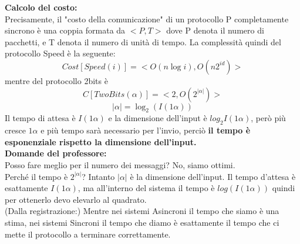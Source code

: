 \textbf{Calcolo del costo:}\\
Precisamente, il "costo della comunicazione" di un protocollo P completamente
sincrono è una coppia formata da $<P,T>$ dove P denota il numero di pacchetti, e
T denota il numero di unità di tempo. La complessità quindi del protocollo Speed
è la seguente:$$Cost[Speed(i)] = <O(n \log i), O(n 2^{id})>$$ mentre del
protocollo 2bits è $$C[TwoBits(\alpha)] = <2, O(2^{|\alpha|})>$$
$$|\alpha|=\log_2(I(1\alpha))$$ Il tempo di attesa è $I(1\alpha)$ e la
dimensione dell'input è $log_2 I(1\alpha)$, però più cresce $1\alpha$ e più
tempo sarà necessario per l'invio, perciò \textbf{il tempo è esponenziale
    rispetto la dimensione dell'input.} \\

\textbf{Domande del professore:}\\
Posso fare meglio per il numero dei messaggi? No, siamo ottimi.\\
Perché il tempo è $2^{|\alpha|}$? Intanto $|\alpha|$ è la dimensione dell'input.
Il tempo d'attesa è esattamente $I(1\alpha)$, ma all'interno del sistema il
tempo è $log(I(1\alpha))$ quindi per ottenerlo devo elevarlo al quadrato.\\
(Dalla registrazione:) Mentre nei sistemi Asincroni il tempo che siamo è una
stima, nei sistemi Sincroni il tempo che diamo è esattamente il tempo che ci
mette il protocollo a terminare correttamente.
